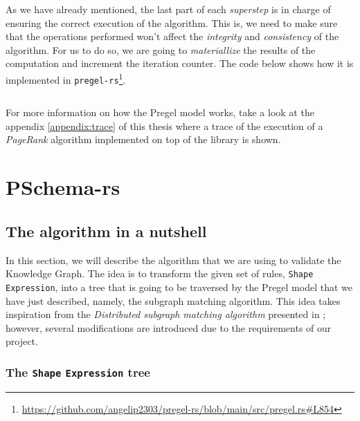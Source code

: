 \begin{code}
    \inputminted{rust}{code/listings/11-6_vprog.rs}
\end{code}

As we have already mentioned, the last part of each \textit{superstep} is in charge of ensuring the correct execution of the algorithm. This is, we need to make sure that the operations performed won't affect the \textit{integrity} and \textit{consistency} of the algorithm. For us to do so, we are going to \textit{materiallize} the results of the computation and increment the iteration counter. The code below shows how it is implemented in \texttt{pregel-rs}\footnote{\url{https://github.com/angelip2303/pregel-rs/blob/main/src/pregel.rs\#L854}}.

\begin{code}
    \inputminted{rust}{code/listings/11-7_collect.rs}
\end{code}

For more information on how the Pregel model works, take a look at the appendix \ref{appendix:trace} of this thesis where a trace of the execution of a \textit{PageRank} algorithm implemented on top of the library is shown.

\section{PSchema-rs}

\subsection{The algorithm in a nutshell}

In this section, we will describe the algorithm that we are using to validate the Knowledge Graph. The idea is to transform the given set of rules, \texttt{Shape} \texttt{Expression}, into a tree that is going to be traversed by the Pregel model that we have just described, namely, the subgraph matching algorithm. This idea takes inspiration from the \textit{Distributed subgraph matching algorithm} presented in \cite{Xu2019}; however, several modifications are introduced due to the requirements of our project.

\subsubsection{The \texttt{Shape} \texttt{Expression} tree}

